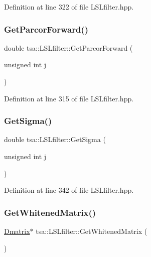 Definition at line 322 of file L\+S\+Lfilter.\+hpp.

\mbox{\label{classtsa_1_1_l_s_lfilter_a3a04a948854ddde91e3aa4bd8a5bf0eb}} 
\subsubsection{\texorpdfstring{Get\+Parcor\+Forward()}{GetParcorForward()}}
{\footnotesize\ttfamily double tsa\+::\+L\+S\+Lfilter\+::\+Get\+Parcor\+Forward (\begin{DoxyParamCaption}\item[{unsigned int}]{j }\end{DoxyParamCaption})\hspace{0.3cm}{\ttfamily [inline]}}



Definition at line 315 of file L\+S\+Lfilter.\+hpp.

\mbox{\label{classtsa_1_1_l_s_lfilter_a06bbde7bf7ba9deed211b3a05ba82890}} 
\subsubsection{\texorpdfstring{Get\+Sigma()}{GetSigma()}}
{\footnotesize\ttfamily double tsa\+::\+L\+S\+Lfilter\+::\+Get\+Sigma (\begin{DoxyParamCaption}\item[{unsigned int}]{j }\end{DoxyParamCaption})\hspace{0.3cm}{\ttfamily [inline]}}



Definition at line 342 of file L\+S\+Lfilter.\+hpp.

\mbox{\label{classtsa_1_1_l_s_lfilter_a4b15685dc591ec522e2a34edcf87082b}} 
\subsubsection{\texorpdfstring{Get\+Whitened\+Matrix()}{GetWhitenedMatrix()}}
{\footnotesize\ttfamily \hyperlink{namespacetsa_ad260cd21c1891c4ed391fe788569aba4}{Dmatrix}$\ast$ tsa\+::\+L\+S\+Lfilter\+::\+Get\+Whitened\+Matrix (\begin{DoxyParamCaption}{ }\end{DoxyParamCaption})\hspace{0.3cm}{\ttfamily [inline]}}


